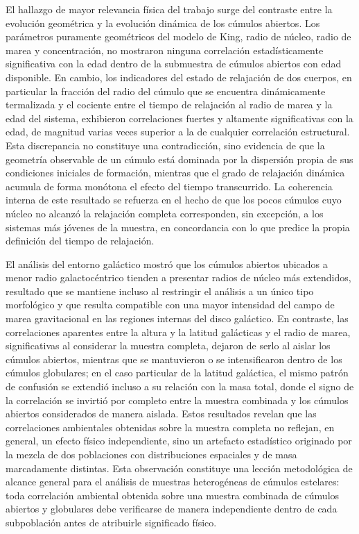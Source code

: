    El hallazgo de mayor relevancia física del trabajo surge del contraste entre 
    la evolución geométrica y la evolución dinámica de los cúmulos abiertos. 
    Los parámetros puramente geométricos del modelo de King, radio de núcleo, 
    radio de marea y concentración, no mostraron ninguna correlación 
    estadísticamente significativa con la edad dentro de la submuestra de 
    cúmulos abiertos con edad disponible. En cambio, los indicadores del estado 
    de relajación de dos cuerpos, en particular la fracción del radio del cúmulo 
    que se encuentra dinámicamente termalizada y el cociente entre el tiempo de 
    relajación al radio de marea y la edad del sistema, exhibieron correlaciones 
    fuertes y altamente significativas con la edad, de magnitud varias veces 
    superior a la de cualquier correlación estructural. Esta discrepancia no 
    constituye una contradicción, sino evidencia de que la geometría observable 
    de un cúmulo está dominada por la dispersión propia de sus condiciones 
    iniciales de formación, mientras que el grado de relajación dinámica acumula 
    de forma monótona el efecto del tiempo transcurrido. La coherencia interna 
    de este resultado se refuerza en el hecho de que los pocos cúmulos cuyo 
    núcleo no alcanzó la relajación completa corresponden, sin excepción, a los 
    sistemas más jóvenes de la muestra, en concordancia con lo que predice la 
    propia definición del tiempo de relajación.

    El análisis del entorno galáctico mostró que los cúmulos abiertos ubicados a 
    menor radio galactocéntrico tienden a presentar radios de núcleo más 
    extendidos, resultado que se mantiene incluso al restringir el análisis a un 
    único tipo morfológico y que resulta compatible con una mayor intensidad del 
    campo de marea gravitacional en las regiones internas del disco galáctico. 
    En contraste, las correlaciones aparentes entre la altura y la latitud 
    galácticas y el radio de marea, significativas al considerar la muestra 
    completa, dejaron de serlo al aislar los cúmulos abiertos, mientras que se 
    mantuvieron o se intensificaron dentro de los cúmulos globulares; en el caso 
    particular de la latitud galáctica, el mismo patrón de confusión se extendió 
    incluso a su relación con la masa total, donde el signo de la correlación se 
    invirtió por completo entre la muestra combinada y los cúmulos abiertos 
    considerados de manera aislada. Estos resultados revelan que las 
    correlaciones ambientales obtenidas sobre la muestra completa no reflejan, 
    en general, un efecto físico independiente, sino un artefacto estadístico 
    originado por la mezcla de dos poblaciones con distribuciones espaciales y 
    de masa marcadamente distintas. Esta observación constituye una lección 
    metodológica de alcance general para el análisis de muestras heterogéneas de 
    cúmulos estelares: toda correlación ambiental obtenida sobre una muestra 
    combinada de cúmulos abiertos y globulares debe verificarse de manera 
    independiente dentro de cada subpoblación antes de atribuirle significado 
    físico.

